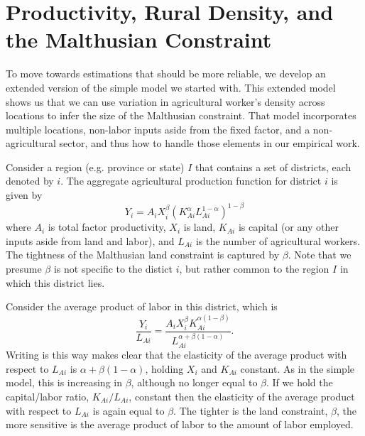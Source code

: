 \documentclass[11pt]{article}
\begin{document}
\section{Productivity, Rural Density, and the Malthusian Constraint}
To move towards estimations that should be more reliable, we develop an extended version of the simple model we started with. This extended model shows us that we can use variation in agricultural worker's density across locations to infer the size of the Malthusian constraint. That model incorporates multiple locations, non-labor inputs aside from the fixed factor, and a non-agricultural sector, and thus how to handle those elements in our empirical work.

Consider a region (e.g. province or state) $I$ that contains a set of districts, each denoted by $i$. The aggregate agricultural production function for district $i$ is given by 
\begin{equation}
Y_{i} = A_{i} X_{i}^{\beta} \left(K_{Ai}^{\alpha}L_{Ai}^{1-\alpha}\right)^{1-\beta} \label{EQ_production}
\end{equation}
where $A_{i}$ is total factor productivity, $X_{i}$ is land, $K_{Ai}$ is capital (or any other inputs aside from land and labor), and $L_{Ai}$ is the number of agricultural workers. The tightness of the Malthusian land constraint is captured by $\beta$. Note that we presume $\beta$ is not specific to the distict $i$, but rather common to the region $I$ in which this district lies.

Consider the average product of labor in this district, which is
\begin{equation}
	\frac{Y_i}{L_{Ai}} = \frac{A_{i} X_{i}^{\beta} K_{Ai}^{\alpha(1-\beta)}}{L_{Ai}^{\alpha + \beta(1-\alpha)}}.
\end{equation}
Writing is this way makes clear that the elasticity of the average product with respect to $L_{Ai}$ is $\alpha + \beta(1-\alpha)$, holding $X_i$ and $K_{Ai}$ constant. As in the simple model, this is increasing in $\beta$, although no longer equal to $\beta$.  If we hold the capital/labor ratio, $K_{Ai}/L_{Ai}$, constant then the elasticity of the average product with respect to $L_{Ai}$ is again equal to $\beta$. The tighter is the land constraint, $\beta$, the more sensitive is the average product of labor to the amount of labor employed.
\end{document}
